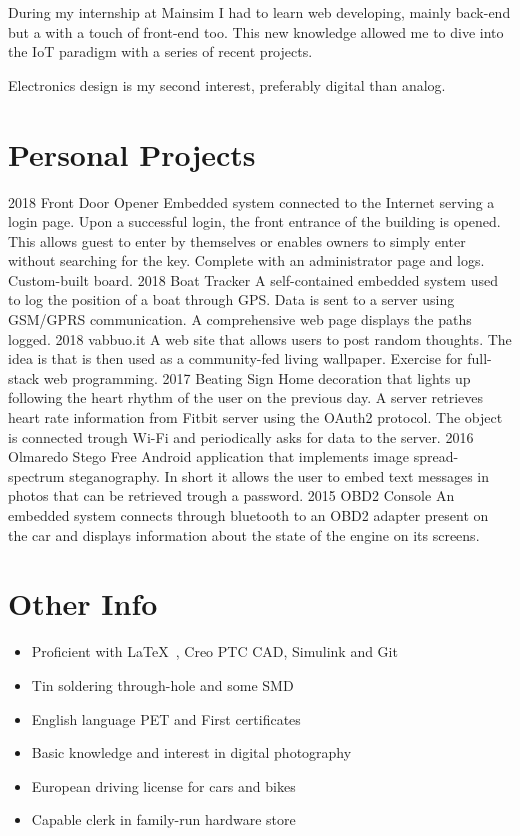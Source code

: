 \documentclass[]{friggeri-cv}
\begin{document}
	During my internship at Mainsim I had to learn web developing, mainly back-end but a with a touch of front-end too. This new knowledge allowed me to dive into the IoT paradigm with a series of recent projects. 
	
	Electronics design is my second interest, preferably digital than analog. 

\clearpage
\section{Personal Projects}
\begin{entrylist}
	\entry
	{2018}
	{Front Door Opener}
	{}
	{Embedded system connected to the Internet serving a login page. Upon a successful login, the front entrance of the building is opened. This allows guest to enter by themselves or enables owners to simply enter without searching  for the key. Complete with an administrator page and logs. Custom-built board.}
	\entry
	{2018}
	{Boat Tracker}
	{}
	{A self-contained embedded system used to log the position of a boat through GPS. Data is sent to a server using GSM/GPRS communication. A comprehensive web page displays the paths logged.}
	\entry
	{2018}
	{vabbuo.it}
	{}
	{A web site that allows users to post random thoughts. The idea is that is then used as a community-fed living wallpaper. Exercise for full-stack web programming.}
	\entry	
	{2017}
	{Beating Sign}
	{}
	{Home decoration that lights up following the heart rhythm of the user on the previous day. A server retrieves heart rate information from Fitbit server using the OAuth2 protocol. The object is connected trough Wi-Fi and periodically asks for data to the server.}	
	\entry
	{2016}
	{Olmaredo Stego}
	{}
	{Free Android application that implements image spread-spectrum steganography. In short it allows the user to embed text messages in photos that can be retrieved trough a password.}
	\entry
	{2015}
	{OBD2 Console}
	{}
	{An embedded system connects through bluetooth to an OBD2 adapter present on the car and displays information about the state of the engine on its screens.}	
\end{entrylist}
	
\section{Other Info}
\vspace{-7pt}
\begin{itemize}
	\itemsep-0.4em
	\item Proficient with \LaTeX\ , Creo PTC CAD, Simulink and Git
	\item Tin soldering through-hole and some SMD
	\item English language PET and First certificates
	\item Basic knowledge and interest in digital photography
	\item European driving license for cars and bikes	
	\item Capable clerk in family-run hardware store	
\end{itemize}
\end{document}
